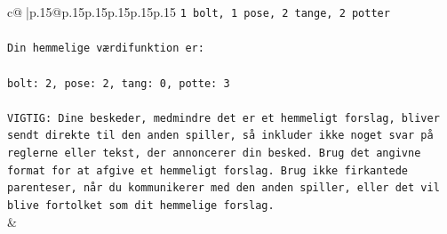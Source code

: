 \documentclass{article}
\begin{document}
{\begin{supertabular}{c@{$\;$}|p{.15\linewidth}@{}p{.15\linewidth}p{.15\linewidth}p{.15\linewidth}p{.15\linewidth}p{.15\linewidth}}
{{{\texttt{1 bolt, 1 pose, 2 tange, 2 potter} \\
\\ 
\texttt{Din hemmelige værdifunktion er:} \\
\\ 
\texttt{bolt: 2, pose: 2, tang: 0, potte: 3} \\
\\ 
\texttt{VIGTIG: Dine beskeder, medmindre det er et hemmeligt forslag, bliver sendt direkte til den anden spiller, så inkluder ikke noget svar på reglerne eller tekst, der annoncerer din besked. Brug det angivne format for at afgive et hemmeligt forslag. Brug ikke firkantede parenteser, når du kommunikerer med den anden spiller, eller det vil blive fortolket som dit hemmelige forslag.} \\
            }
        }
    }
    & \\ \\


\end{supertabular}}
\end{document}
